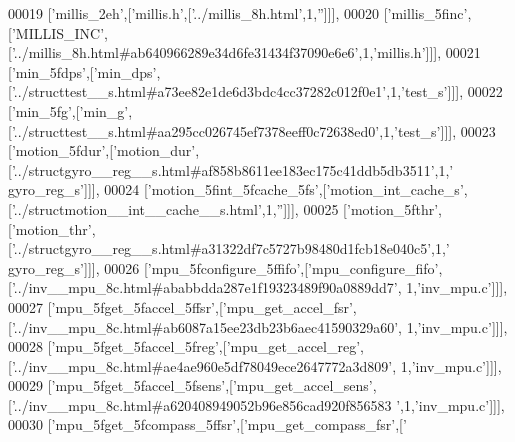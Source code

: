 \begin{DoxyCode}
00019   [\textcolor{stringliteral}{'millis\_2eh'},[\textcolor{stringliteral}{'millis.h'},[\textcolor{stringliteral}{'../millis\_8h.html'},1,\textcolor{stringliteral}{''}]]],
00020   [\textcolor{stringliteral}{'millis\_5finc'},[\textcolor{stringliteral}{'MILLIS\_INC'},[\textcolor{stringliteral}{'../millis\_8h.html#ab640966289e34d6fe31434f37090e6e6'},1,\textcolor{stringliteral}{'millis.h'}]]],
00021   [\textcolor{stringliteral}{'min\_5fdps'},[\textcolor{stringliteral}{'min\_dps'},[\textcolor{stringliteral}{'../structtest\_\_s.html#a73ee82e1de6d3bdc4cc37282c012f0e1'},1,\textcolor{stringliteral}{'test\_s'}]]],
00022   [\textcolor{stringliteral}{'min\_5fg'},[\textcolor{stringliteral}{'min\_g'},[\textcolor{stringliteral}{'../structtest\_\_s.html#aa295cc026745ef7378eeff0c72638ed0'},1,\textcolor{stringliteral}{'test\_s'}]]],
00023   [\textcolor{stringliteral}{'motion\_5fdur'},[\textcolor{stringliteral}{'motion\_dur'},[\textcolor{stringliteral}{'../structgyro\_\_reg\_\_s.html#af858b8611ee183ec175c41ddb5db3511'},1,\textcolor{stringliteral}{'
      gyro\_reg\_s'}]]],
00024   [\textcolor{stringliteral}{'motion\_5fint\_5fcache\_5fs'},[\textcolor{stringliteral}{'motion\_int\_cache\_s'},[\textcolor{stringliteral}{'../structmotion\_\_int\_\_cache\_\_s.html'},1,\textcolor{stringliteral}{''}]]],
00025   [\textcolor{stringliteral}{'motion\_5fthr'},[\textcolor{stringliteral}{'motion\_thr'},[\textcolor{stringliteral}{'../structgyro\_\_reg\_\_s.html#a31322df7c5727b98480d1fcb18e040c5'},1,\textcolor{stringliteral}{'
      gyro\_reg\_s'}]]],
00026   [\textcolor{stringliteral}{'mpu\_5fconfigure\_5ffifo'},[\textcolor{stringliteral}{'mpu\_configure\_fifo'},[\textcolor{stringliteral}{'../inv\_\_mpu\_8c.html#ababbdda287e1f19323489f90a0889dd7'},
      1,\textcolor{stringliteral}{'inv\_mpu.c'}]]],
00027   [\textcolor{stringliteral}{'mpu\_5fget\_5faccel\_5ffsr'},[\textcolor{stringliteral}{'mpu\_get\_accel\_fsr'},[\textcolor{stringliteral}{'../inv\_\_mpu\_8c.html#ab6087a15ee23db23b6aec41590329a60'},
      1,\textcolor{stringliteral}{'inv\_mpu.c'}]]],
00028   [\textcolor{stringliteral}{'mpu\_5fget\_5faccel\_5freg'},[\textcolor{stringliteral}{'mpu\_get\_accel\_reg'},[\textcolor{stringliteral}{'../inv\_\_mpu\_8c.html#ae4ae960e5df78049ece2647772a3d809'},
      1,\textcolor{stringliteral}{'inv\_mpu.c'}]]],
00029   [\textcolor{stringliteral}{'mpu\_5fget\_5faccel\_5fsens'},[\textcolor{stringliteral}{'mpu\_get\_accel\_sens'},[\textcolor{stringliteral}{'../inv\_\_mpu\_8c.html#a620408949052b96e856cad920f856583
      '},1,\textcolor{stringliteral}{'inv\_mpu.c'}]]],
00030   [\textcolor{stringliteral}{'mpu\_5fget\_5fcompass\_5ffsr'},[\textcolor{stringliteral}{'mpu\_get\_compass\_fsr'},[\textcolor{stringliteral}{'
}
\end{DoxyCode}
